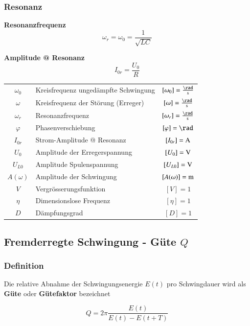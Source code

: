 \subsubsection{Resonanz}

\begin{minipage}{0.48\linewidth}
\textbf{Resonanzfrequenz}
$$ \boxed{ \omega_r = \omega_0 = \frac{1}{\sqrt{LC}} } $$ 
\end{minipage}
\hfill
\begin{minipage}{0.48\linewidth}
\textbf{Amplitude @ Resonanz}
$$ \boxed{ I_{0r} = \frac{U_0}{R} } $$ 
\end{minipage}


\vspace{0.2cm}


\begin{tabular}{c l c}
\rule{0pt}{10pt} $\omega_0$ & Kreisfrequenz ungedämpfte Schwingung & $[\omega_0] = \frac{\rad}{\s}$ \\
\rule{0pt}{10pt} $\omega$ & Kreisfrequenz der Störung (Erreger) & $[\omega] = \frac{\rad}{\s}$ \\
\rule{0pt}{10pt} $\omega_r$ & Resonanzfrequenz & $[\omega_r] = \frac{\rad}{\s}$ \\
$\varphi$ & Phasenverschiebung & $[ \varphi] = \rad$ \\
$I_{0r}$ & Strom-Amplitude @ Resonanz & $[I_{0r}] = \mathrm{A}$ \\
$U_0$ & Amplitude der Erregerspannung & $[U_0] = \mathrm{V}$ \\
$U_{L0}$ & Amplitude Spulenspannung & $[U_{L0}] = \mathrm{V}$ \\
$A(\omega)$ & Amplitude der Schwingung & $[A(\omega)] = \mathrm{m}$ \\
$V$ & Vergrösserungsfunktion & $[V] = 1$ \\
$\eta$ & Dimensionslose Frequenz & $[\eta] = 1$  \\
$D$ & Dämpfungsgrad & $[D] = 1$ 
\end{tabular}





\subsection{Fremderregte Schwingung - Güte $Q$}
\subsubsection{Definition}

\begin{minipage}{0.55\linewidth}
    Die relative Abnahme der Schwingungsenergie $E(t)$ pro Schwingdauer wird als \textbf{Güte} oder \textbf{Gütefaktor} bezeichnet 
\end{minipage}
\hfill
\begin{minipage}{0.45\linewidth}
    $$ \boxed{ Q = 2 \pi \frac{E(t)}{E(t) - E(t + T)} }$$ 
\end{minipage}



